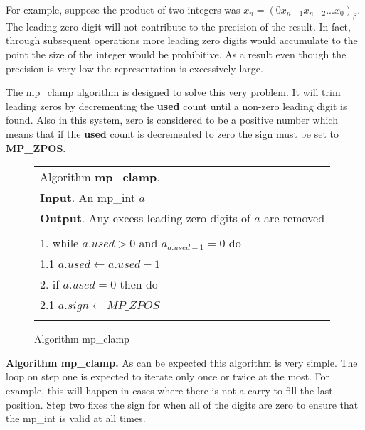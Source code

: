 \documentclass[b5paper]{book}
\begin{document}
For example, suppose the product of two integers was $x_n = (0x_{n-1}x_{n-2}...x_0)_{\beta}$.  The leading zero digit 
will not contribute to the precision of the result.  In fact, through subsequent operations more leading zero digits would
accumulate to the point the size of the integer would be prohibitive.  As a result even though the precision is very 
low the representation is excessively large.  

The mp\_clamp algorithm is designed to solve this very problem.  It will trim leading zeros by decrementing the 
\textbf{used} count until a non-zero leading digit is found.  Also in this system, zero is considered to be a positive 
number which means that if the \textbf{used} count is decremented to zero the sign must be set to \textbf{MP\_ZPOS}.

\begin{figure}[here]
\begin{center}
\begin{tabular}{l}
\hline Algorithm \textbf{mp\_clamp}. \\
\textbf{Input}.   An mp\_int $a$ \\
\textbf{Output}.  Any excess leading zero digits of $a$ are removed \\
\hline \\
1.  while $a.used > 0$ and $a_{a.used - 1} = 0$ do \\
\hspace{+3mm}1.1  $a.used \leftarrow a.used - 1$ \\
2.  if $a.used = 0$ then do \\
\hspace{+3mm}2.1  $a.sign \leftarrow MP\_ZPOS$ \\
\hline \\
\end{tabular}
\end{center}
\caption{Algorithm mp\_clamp}
\end{figure}

\textbf{Algorithm mp\_clamp.}
As can be expected this algorithm is very simple.  The loop on step one is expected to iterate only once or twice at
the most.  For example, this will happen in cases where there is not a carry to fill the last position.  Step two fixes the sign for 
when all of the digits are zero to ensure that the mp\_int is valid at all times.
\end{document}
